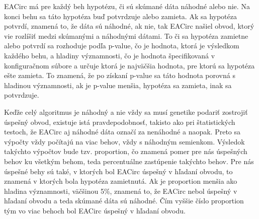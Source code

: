 EACirc má pre každý beh hypotézu, či sú skúmané dáta náhodné alebo nie. Na konci behu sa táto hypotéza buď potvrdzuje alebo zamieta. Ak sa hypotéza potvrdí, znamená to, že dáta sú náhodné, ak nie, tak EACirc našiel obvod, ktorý vie rozlíšiť medzi skúmanými a náhodnými dátami. To či sa hypotéza zamietne alebo potvrdí sa rozhoduje podľa p-value, čo je hodnota, ktorá je výsledkom každého behu, a hladiny významnosti, čo je hodnota špecifikovaná v konfiguračnom súbore a určuje ktorá je najväčšia hodnota, pre ktorú sa hypotéza ešte zamieta. To znamená, že po získaní p-value sa táto hodnota porovná s hladinou významnosti, ak je p-value menšia, hypotéza sa zamieta, inak sa potvrdzuje. 

Keďže celý algoritmus je náhodný a nie vždy sa musí genetike podariť zostrojiť úspešný obvod, existuje istá pravdepodobnosť, takisto ako pri štatistických testoch, že EACirc aj náhodné dáta označí za nenáhodné a naopak. Preto sa výpočty vždy počítajú na viac behov, vždy s náhodným semienkom. Výsledok takýchto výpočtov bude tzv. proportion, čo znamená pomer pre nás úspešných behov ku všetkým behom, teda percentuálne zastúpenie takýchto behov. Pre nás úspešné behy sú také, v ktorých bol EACirc úspešný v hľadaní obvodu, to znamená v ktorých bola hypotéza zamietnutá. Ak je proportion menšia ako hladina významnosti, väčšinou 5\%, znamená to, že EACirc nebol úspešný v hľadaní obvodu a teda skúmané dáta sú náhodné. Čím vyššie číslo proportion tým vo viac behoch bol EACirc úspešný v hľadaní obvodu. 




